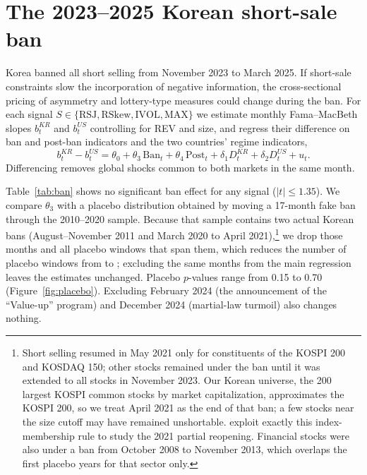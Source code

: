 \documentclass[11pt]{article}
\begin{document}
\section{The 2023--2025 Korean short-sale ban}\label{sec:ban}

Korea banned all short selling from November 2023 to March 2025. If short-sale constraints slow the incorporation of negative information, the cross-sectional pricing of asymmetry and lottery-type measures could change during the ban. For each signal $S\in\{\text{RSJ},\text{RSkew},\text{IVOL},\text{MAX}\}$ we estimate monthly Fama--MacBeth slopes $b^{KR}_t$ and $b^{US}_t$ controlling for REV and size, and regress their difference on ban and post-ban indicators and the two countries' regime indicators,
\begin{equation}
b^{KR}_t-b^{US}_t=\theta_0+\theta_3\,\text{Ban}_t+\theta_4\,\text{Post}_t+\delta_1 D^{KR}_t+\delta_2 D^{US}_t+u_t .
\end{equation}
Differencing removes global shocks common to both markets in the same month.

Table~\ref{tab:ban} shows no significant ban effect for any signal ($|t|\le1.35$). We compare $\theta_3$ with a placebo distribution obtained by moving a 17-month fake ban through the 2010--2020 sample. Because that sample contains two actual Korean bans (August--November 2011 and March 2020 to April 2021),\footnote{Short selling resumed in May 2021 only for constituents of the KOSPI 200 and KOSDAQ 150; other stocks remained under the ban until it was extended to all stocks in November 2023. Our Korean universe, the 200 largest KOSPI common stocks by market capitalization, approximates the KOSPI 200, so we treat April 2021 as the end of that ban; a few stocks near the size cutoff may have remained unshortable. \citet{kimkim2024} exploit exactly this index-membership rule to study the 2021 partial reopening. Financial stocks were also under a ban from October 2008 to November 2013, which overlaps the first placebo years for that sector only.} we drop those months and all placebo windows that span them, which reduces the number of placebo windows from \nPlaceboOld{} to \nPlaceboNew{}; excluding the same months from the main regression leaves the estimates unchanged. Placebo $p$-values range from 0.15 to 0.70 (Figure~\ref{fig:placebo}). Excluding February 2024 (the announcement of the ``Value-up'' program) and December 2024 (martial-law turmoil) also changes nothing.
\end{document}
